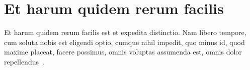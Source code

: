 
\section{Et harum quidem rerum facilis}

Et harum quidem rerum facilis est et expedita distinctio. Nam libero tempore, cum soluta nobis est eligendi optio, cumque nihil impedit, quo minus id, quod maxime placeat, facere possimus, omnis voluptas assumenda est, omnis dolor repellendus~\cite{isotc37sc4:dcr}.


